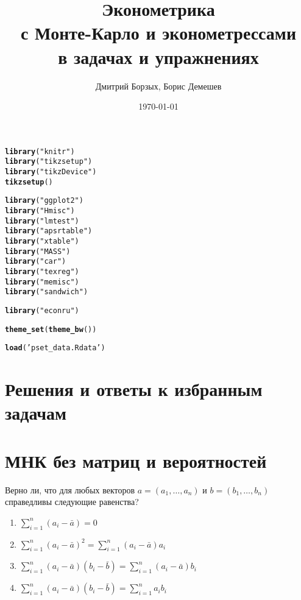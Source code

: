 \documentclass[pdftex,11pt,openany]{book}\usepackage[]{graphicx}\usepackage[]{color}
\title{Эконометрика \\ {\small с Монте-Карло и эконометрессами} \\ в задачах и упражнениях}
\author{Дмитрий Борзых, Борис Демешев}
\date{\today}
\makeatletter
\newcommand{\hlstr}[1]{\textcolor[rgb]{0.192,0.494,0.8}{#1}}%
\newcommand{\hlstd}[1]{\textcolor[rgb]{0.345,0.345,0.345}{#1}}%
\newcommand{\hlkwd}[1]{\textcolor[rgb]{0.737,0.353,0.396}{\textbf{#1}}}%
\newenvironment{kframe}{%
 \def\at@end@of@kframe{}%
 \ifinner\ifhmode%
  \def\at@end@of@kframe{\end{minipage}}%
  \begin{minipage}{\columnwidth}%
 \fi\fi%
 \def\FrameCommand##1{\hskip\@totalleftmargin \hskip-\fboxsep
 \colorbox{shadecolor}{##1}\hskip-\fboxsep
     \hskip-\linewidth \hskip-\@totalleftmargin \hskip\columnwidth}%
 \MakeFramed {\advance\hsize-\width
   \@totalleftmargin\z@ \linewidth\hsize
   \@setminipage}}%
 {\par\unskip\endMakeFramed%
 \at@end@of@kframe}
\newenvironment{knitrout}{}{} %
\makeatother
\begin{document}
\setcounter{page}{3}

\tableofcontents




\vspace{30pt}


\begin{knitrout}
\color{fgcolor}\begin{kframe}
\begin{alltt}
\hlkwd{library}\hlstd{(}\hlstr{"knitr"}\hlstd{)}
\hlkwd{library}\hlstd{(}\hlstr{"tikzsetup"}\hlstd{)}
\hlkwd{library}\hlstd{(}\hlstr{"tikzDevice"}\hlstd{)}
\hlkwd{tikzsetup}\hlstd{()}

\hlkwd{library}\hlstd{(}\hlstr{"ggplot2"}\hlstd{)}
\hlkwd{library}\hlstd{(}\hlstr{"Hmisc"}\hlstd{)}
\hlkwd{library}\hlstd{(}\hlstr{"lmtest"}\hlstd{)}
\hlkwd{library}\hlstd{(}\hlstr{"apsrtable"}\hlstd{)}
\hlkwd{library}\hlstd{(}\hlstr{"xtable"}\hlstd{)}
\hlkwd{library}\hlstd{(}\hlstr{"MASS"}\hlstd{)}
\hlkwd{library}\hlstd{(}\hlstr{"car"}\hlstd{)}
\hlkwd{library}\hlstd{(}\hlstr{"texreg"}\hlstd{)}
\hlkwd{library}\hlstd{(}\hlstr{"memisc"}\hlstd{)}
\hlkwd{library}\hlstd{(}\hlstr{"sandwich"}\hlstd{)}

\hlkwd{library}\hlstd{(}\hlstr{"econru"}\hlstd{)}

\hlkwd{theme_set}\hlstd{(}\hlkwd{theme_bw}\hlstd{())}

\hlkwd{load}\hlstd{(}\hlstr{'pset_data.Rdata'}\hlstd{)}
\end{alltt}
\end{kframe}
\end{knitrout}



\chapter{Решения и ответы к избранным задачам}

\solutiononly




\chapter{МНК без матриц и вероятностей}

\begin{problem}
 Верно ли, что для любых векторов $a = (a_1,\dots,a_n)$ и $b = (b_1,\dots,b_n)$ справедливы следующие равенства?
\begin{enumerate}
\item $\sum_{i=1}^n {(a_i-\bar a)} = 0$
\item $\sum_{i=1}^n {(a_i-\bar a)^2} = \sum_{i=1}^n {(a_i-\bar a)a_i}$
\item $\sum_{i=1}^n {(a_i-\bar a)(b_i-\bar b)} = \sum_{i=1}^n {(a_i-\bar a)b_i}$
\item $\sum_{i=1}^n {(a_i-\bar a)(b_i-\bar b)} = \sum_{i=1}^n {a_i b_i}$
\end{enumerate}
\end{problem}
\end{document}
